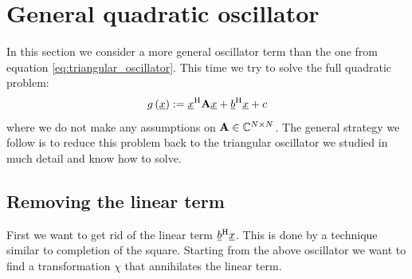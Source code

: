 \documentclass[a4paper,10pt]{article}
\begin{document}
\section{General quadratic oscillator}


In this section we consider a more general oscillator term
than the one from equation \eqref{eq:triangular_oscillator}.
This time we try to solve the full quadratic problem:
\begin{equation} \label{eq:general_oscillator}
  g\left(\underline{x}\right) := \underline{x}{}^{\textnormal{H}} \mathbf{A} \underline{x} + \underline{b}{}^{\textnormal{H}} \underline{x} + c
\end{equation}
where we do not make any assumptions on $\mathbf{A} \in \mathbb{C}^{N \times N}$.
The general strategy we follow is to reduce this problem back to the
triangular oscillator we studied in much detail and know how to solve.


\subsection{Removing the linear term}


First we want to get rid of the linear term $\underline{b}{}^{\textnormal{H}} \underline{x}$.
This is done by a technique similar to completion of the square.
Starting from the above oscillator we want to find a transformation
$\chi$ that annihilates the linear term.
\end{document}
